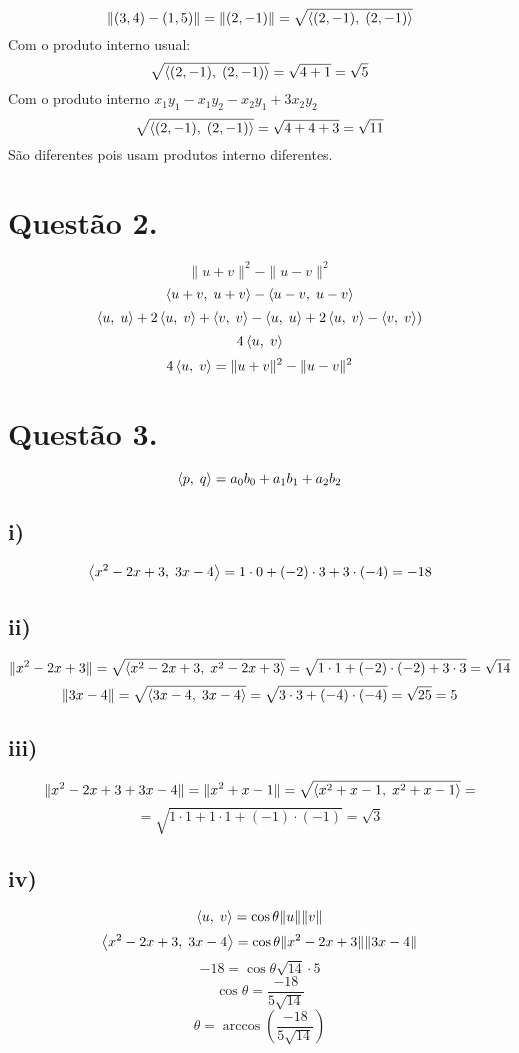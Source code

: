 \documentclass[12pt]{article}
\begin{document}
\[\|(3,4)-(1,5)\| = \|(2,-1)\| = \sqrt{\left\langle(2,-1),\;(2,-1)\right\rangle}\]
Com o produto interno usual:
\[\sqrt{\left\langle(2,-1),\;(2,-1)\right\rangle} = \sqrt{4+1} = \sqrt{5}\]
Com o produto interno $x_{1}y_{1}-x_{1}y_{2}-x_{2}y_{1}+3x_{2}y_{2}$
\[\sqrt{\left\langle(2,-1),\;(2,-1)\right\rangle} = \sqrt{4+4+3} = \sqrt{11}\]
São diferentes pois usam produtos interno diferentes.
\section{Questão 2.}

\[\|u+v\|^{2} - \|u-v\|^{2}\]
\[\left\langle u+v,\;u+v\right\rangle - \left\langle u-v,\;u-v\right\rangle\]
\[\left\langle u,\;u\right\rangle + 2\left\langle u,\;v\right\rangle + \left\langle v,\;v\right\rangle - \left\langle u,\;u\right\rangle + 2\left\langle u,\;v\right\rangle - \left\langle v,\;v\right\rangle)\]
\[4\left\langle u,\;v\right\rangle\]
\[4\left\langle u,\;v\right\rangle = \|u+v\|^{2} - \|u-v\|^{2}\]

\section{Questão 3.}

\[\left\langle p,\;q\right\rangle = a_{0}b_{0}+a_{1}b_{1}+a_{2}b_{2}\]

\subsection{i)}

\[\left\langle x^{2}-2x+3,\;3x-4\right\rangle = 1\cdot0 + (-2)\cdot3 + 3\cdot(-4) = -18\]

\subsection{ii)}

\[\|x^{2}-2x+3\| = \sqrt{\left\langle x^{2}-2x+3,\;x^{2}-2x+3\right\rangle} = \sqrt{1\cdot1 + (-2)\cdot(-2) + 3\cdot3} = \sqrt{14}\]
\[\|3x-4\| = \sqrt{\left\langle3x-4,\;3x-4\right\rangle} = \sqrt{3\cdot3 + (-4)\cdot(-4)} = \sqrt{25} = 5\]

\subsection{iii)}

\[\|x^{2}-2x+3 + 3x-4\| = \|x^{2}+x-1\| = \sqrt{\left\langle x^{2}+x-1,\;x^{2}+x-1\right\rangle} =\]
\[= \sqrt{1\cdot1+1\cdot1+(-1)\cdot(-1)} = \sqrt{3}\]

\subsection{iv)}

\[\left\langle u,\;v\right\rangle = \cos\theta \|u\| \|v\|\]
\[\left\langle x^{2}-2x+3,\;3x-4\right\rangle = \cos\theta \|x^{2}-2x+3\| \|3x-4\|\]
\[-18 = \cos\theta \sqrt{14} \cdot 5\]
\[\cos\theta = \dfrac{-18}{5\sqrt{14}}\]
\[\theta = \arccos\left( \dfrac{-18}{5\sqrt{14}} \right)\]
\end{document}
